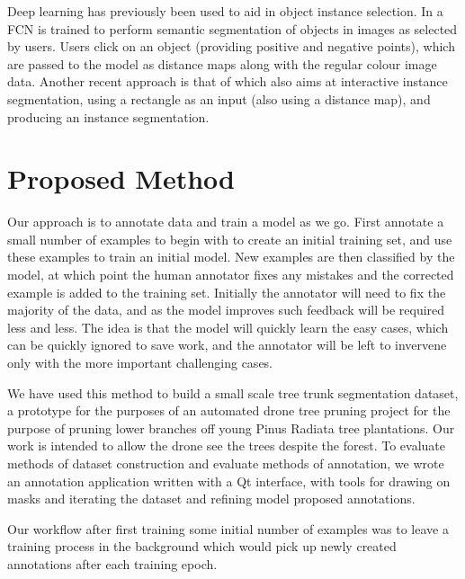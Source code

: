 Deep learning has previously been used to aid in object instance selection. In \cite{Xu2016} a \gls{FCN} is trained to perform semantic segmentation of objects in images as selected by users. Users click on an object (providing positive and negative points), which are passed to the model as distance maps along with the regular colour image data. Another recent approach is that of \cite{Xu2017} which also aims at interactive instance segmentation, using a rectangle as an input (also using a distance map), and producing an instance segmentation.






\section{Proposed Method}

Our approach is to annotate data and train a model as we go. First annotate a small number of examples to begin with to create an initial training set, and use these examples to train an initial model. New examples are then classified by the model, at which point the human annotator fixes any mistakes and the corrected example is added to the training set. Initially the annotator will need to fix the majority of the data, and as the model improves such feedback will be required less and less. The idea is that the model will quickly learn the easy cases, which can be quickly ignored to save work, and the annotator will be left to invervene only with the more important challenging cases.

We have used this method to build a small scale tree trunk segmentation dataset, a prototype for the purposes of an automated drone tree pruning project for the purpose of pruning lower branches off young Pinus Radiata tree plantations. Our work is intended to allow the drone see the trees despite the forest. To evaluate methods of dataset construction and evaluate methods of annotation, we wrote an annotation application written with a Qt interface, with tools for drawing on masks and iterating the dataset and refining model proposed annotations.

Our workflow after first training some initial number of examples was to leave a training process in the background which would pick up newly created annotations after each training epoch. 


